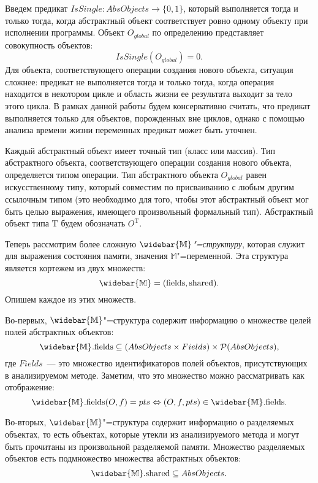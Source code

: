 \documentclass[14pt,titlepage,draft]{extarticle}
\newcommand{\M}{\ensuremath{\mathbb{M}}}
\newcommand{\Ms}{\ensuremath{\mathbb{\widebar{M}}}}
\newcommand{\Mf}[1]{\ensuremath{\mathrm{#1}}}
\newcommand{\type}[1]{\mathrm{#1}}
\newcommand{\AOTyped}[1]{O^{\type{#1}}}
\newcommand{\AO}{O}
\newcommand{\AOGlobal}{\AO_{global}}
\begin{document}
    Введем предикат $IsSingle\colon AbsObjects \to \{0, 1\}$, который
    выполняется тогда и только тогда, когда абстрактный объект соответствует
    ровно одному объекту при исполнении программы. Объект $\AOGlobal$ по
    определению представляет совокупность объектов:
    \[ IsSingle(\AOGlobal) = 0. \]
    Для объекта, соответствующего операции создания нового объекта, ситуация
    сложнее: предикат не выполняется тогда и только тогда, когда операция
    находится в некотором цикле и область жизни ее результата выходит за тело
    этого цикла. В рамках данной работы будем консервативно считать, что
    предикат выполняется только для объектов, порожденных вне циклов, однако с
    помощью анализа времени жизни переменных предикат может быть уточнен.

    Каждый абстрактный объект имеет точный тип (класс или массив). Тип
    абстрактного объекта, соответствующего операции создания нового объекта,
    определяется типом операции. Тип абстрактного объекта $\AOGlobal$ равен
    искусственному типу, который совместим по присваиванию с любым другим
    ссылочным типом (это необходимо для того, чтобы этот абстрактный объект мог
    быть целью выражения, имеющего произвольный формальный тип). Абстрактный
    объект типа $\type{T}$ будем обозначать $\AOTyped{T}$.

    Теперь рассмотрим более сложную \emph{\Ms"=структуру}, которая служит для
    выражения состояния памяти, значения \M"=переменной.
    Эта структура является кортежем из двух множеств:
    \[ \Ms = (\Mf{fields}, \Mf{shared}). \]
    Опишем каждое из этих множеств.

    Во-первых, \Ms"=структура содержит информацию о множестве целей полей
    абстрактных объектов:
    \[
      \Ms.\Mf{fields} \subseteq
        (AbsObjects \times Fields) \times
        \powerset{AbsObjects},
    \]
    где $Fields$~--- это множество идентификаторов полей объектов,
    присутствующих в анализируемом методе.
    Заметим, что это множество можно рассматривать как отображение:
    \[
      \Ms.\Mf{fields}(O, f) = pts \Leftrightarrow
        (O, f, pts) \in \Ms.\Mf{fields}.
    \]

    Во-вторых, \Ms"=структура содержит информацию о разделяемых объектах,
    то есть объектах, которые утекли  из анализируемого метода
    и могут быть прочитаны из произвольной разделяемой памяти. Множество
    разделяемых объектов есть подмножество множества абстрактных объектов:
    \[ \Ms.\Mf{shared} \subseteq AbsObjects. \]
\end{document}
